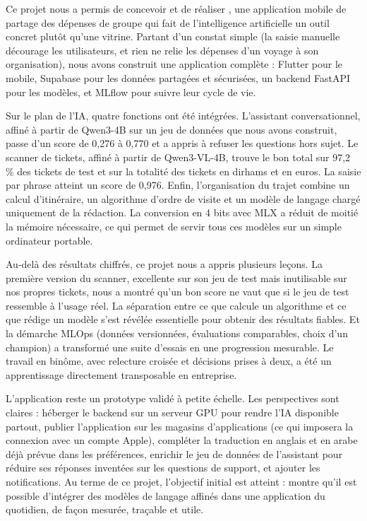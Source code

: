 
Ce projet nous a permis de concevoir et de réaliser \equipay, une application mobile de
partage des dépenses de groupe qui fait de l'intelligence artificielle un outil concret
plutôt qu'une vitrine. Partant d'un constat simple (la saisie manuelle décourage les
utilisateurs, et rien ne relie les dépenses d'un voyage à son organisation), nous avons
construit une application complète : Flutter pour le mobile, Supabase pour les données
partagées et sécurisées, un backend FastAPI pour les modèles, et MLflow pour suivre leur
cycle de vie.

Sur le plan de l'IA, quatre fonctions ont été intégrées. L'assistant conversationnel, affiné
à partir de Qwen3-4B sur un jeu de données que nous avons construit, passe d'un score de
0,276 à 0,770 et a appris à refuser les questions hors sujet. Le scanner de tickets, affiné à
partir de Qwen3-VL-4B, trouve le bon total sur 97,2 \% des tickets de test et sur la totalité
des tickets en dirhams et en euros. La saisie par phrase atteint un score de 0,976. Enfin,
l'organisation du trajet combine un calcul d'itinéraire, un algorithme d'ordre de visite et
un modèle de langage chargé uniquement de la rédaction. La conversion en 4 bits avec MLX a
réduit de moitié la mémoire nécessaire, ce qui permet de servir tous ces modèles sur un
simple ordinateur portable.

Au-delà des résultats chiffrés, ce projet nous a appris plusieurs leçons. La première
version du scanner, excellente sur son jeu de test mais inutilisable sur nos propres
tickets, nous a montré qu'un bon score ne vaut que si le jeu de test ressemble à l'usage
réel. La séparation entre ce que calcule un algorithme et ce que rédige un modèle s'est
révélée essentielle pour obtenir des résultats fiables. Et la démarche MLOps (données
versionnées, évaluations comparables, choix d'un champion) a transformé une suite d'essais en
une progression mesurable. Le travail en binôme, avec relecture croisée et décisions prises
à deux, a été un apprentissage directement transposable en entreprise.

L'application reste un prototype validé à petite échelle. Les perspectives sont claires :
héberger le backend sur un serveur GPU pour rendre l'IA disponible partout, publier
l'application sur les magasins d'applications (ce qui imposera la connexion avec un compte
Apple), compléter la traduction en anglais et en arabe déjà prévue dans les préférences,
enrichir le jeu de données de l'assistant pour réduire ses réponses inventées sur les
questions de support, et ajouter les notifications. Au terme de ce projet, l'objectif initial
est atteint : \equipay montre qu'il est possible d'intégrer des modèles de langage affinés
dans une application du quotidien, de façon mesurée, traçable et utile.
